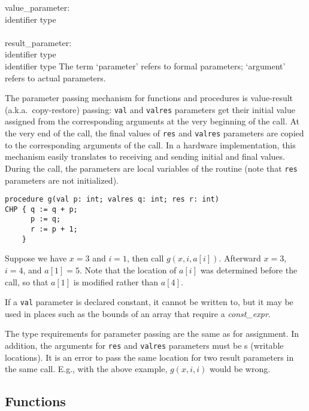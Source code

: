 \grammarstart
value\_parameter: \\
      \OPT identifier\LIST {\tt{}:} type \\
 \\
result\_parameter: \\
        identifier\LIST {\tt{}:} type \\
\orbox {} identifier\LIST {\tt{}:} type
\grammarend
The term `parameter' refers to formal parameters; `argument' refers to
actual parameters.

The parameter passing mechanism for functions and procedures is value-result
(a.k.a.~copy-restore) passing: {\tt{}val} and {\tt{}valres} parameters
get their initial
value assigned from the corresponding arguments at the very beginning
of the call. At the very end of the call, the final values of
{\tt{}res} and {\tt{}valres} parameters are copied to the corresponding
arguments of the call. In a hardware implementation, this mechanism
easily translates to receiving and sending initial and
final values. During the call, the parameters are local variables of
the routine (note that {\tt{}res} parameters are not initialized).

\begin{verbatim}
procedure g(val p: int; valres q: int; res r: int)
CHP { q := q + p;
      p := q;
      r := p + 1;
    }
\end{verbatim}
Suppose we have $x=3$ and $i=1$, then call $g(x, i, a[i])$.
Afterward $x=3$, $i=4$, and $a[1]=5$. Note that the location of $a[i]$
was determined before the call, so that $a[1]$ is modified rather than
$a[4]$.

If a {\tt{}val} parameter is declared constant, it cannot be written to,
but it may be used in places such as the bounds of an array that require
a {\it{}const\_expr}.

The type requirements for parameter passing are the same as for
assignment. In addition, the arguments for {\tt{}res} and {\tt{}valres}
parameters must be \lvalue s (writable locations).
It is an error to pass the same location for two result parameters in
the same call. E.g., with the above example, $g(x, i, i)$ would be wrong.


\subsection{Functions}\label{sec:function}

